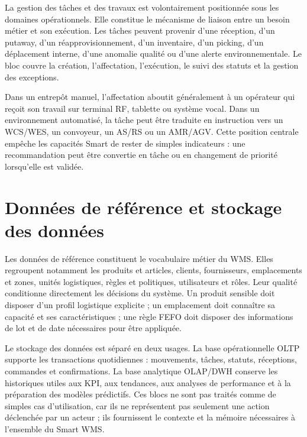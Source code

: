 \label{sec:4.5}

La gestion des tâches et des travaux est volontairement positionnée sous les domaines opérationnels. Elle constitue le mécanisme de liaison entre un besoin métier et son exécution. Les tâches peuvent provenir d’une réception, d’un putaway, d’un réapprovisionnement, d’un inventaire, d’un picking, d’un déplacement interne, d’une anomalie qualité ou d’une alerte environnementale. Le bloc couvre la création, l’affectation, l’exécution, le suivi des statuts et la gestion des exceptions.


Dans un entrepôt manuel, l’affectation aboutit généralement à un opérateur qui reçoit son travail sur terminal RF, tablette ou système vocal. Dans un environnement automatisé, la tâche peut être traduite en instruction vers un WCS/WES, un convoyeur, un AS/RS ou un AMR/AGV. Cette position centrale empêche les capacités Smart de rester de simples indicateurs : une recommandation peut être convertie en tâche ou en changement de priorité lorsqu’elle est validée.



\section{Données de référence et stockage des données}

\label{sec:4.6}

Les données de référence constituent le vocabulaire métier du WMS. Elles regroupent notamment les produits et articles, clients, fournisseurs, emplacements et zones, unités logistiques, règles et politiques, utilisateurs et rôles. Leur qualité conditionne directement les décisions du système. Un produit sensible doit disposer d’un profil logistique explicite ; un emplacement doit connaître sa capacité et ses caractéristiques ; une règle FEFO doit disposer des informations de lot et de date nécessaires pour être appliquée.


Le stockage des données est séparé en deux usages. La base opérationnelle OLTP supporte les transactions quotidiennes : mouvements, tâches, statuts, réceptions, commandes et confirmations. La base analytique OLAP/DWH conserve les historiques utiles aux KPI, aux tendances, aux analyses de performance et à la préparation des modèles prédictifs. Ces blocs ne sont pas traités comme de simples cas d’utilisation, car ils ne représentent pas seulement une action déclenchée par un acteur ; ils fournissent le contexte et la mémoire nécessaires à l’ensemble du Smart WMS.


